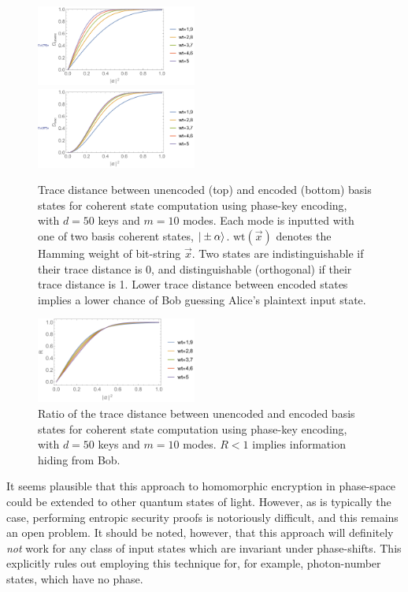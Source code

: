 \begin{figure}[!htb]
\includegraphics[width=0.47\textwidth]{coherent_state_homo_unenc} \\
\includegraphics[width=0.47\textwidth]{coherent_state_homo_enc}
\caption{Trace distance between unencoded (top) and encoded (bottom) basis states for coherent state computation using phase-key encoding, with \mbox{$d=50$} keys and \mbox{$m=10$} modes. Each mode is inputted with one of two basis coherent states, \mbox{$|\pm\alpha\rangle$}. \mbox{$\text{wt}(\vec{x})$} denotes the Hamming weight of bit-string $\vec{x}$. Two states are indistinguishable if their trace distance is 0, and distinguishable (orthogonal) if their trace distance is 1. Lower trace distance between encoded states implies a lower chance of Bob guessing Alice's plaintext input state.} \label{fig:homo_coh_st_tr}
\end{figure}

\begin{figure}[!htb]
\includegraphics[width=0.47\textwidth]{coherent_state_homo_ratio}
\caption{Ratio of the trace distance between unencoded and encoded basis states for coherent state computation using phase-key encoding, with \mbox{$d=50$} keys and \mbox{$m=10$} modes. \mbox{$R<1$} implies information hiding from Bob.} \label{fig:homo_coh_st_ratio}
\end{figure}

It seems plausible that this approach to homomorphic encryption in phase-space could be extended to other quantum states of light. However, as is typically the case, performing entropic security proofs is notoriously difficult, and this remains an open problem. It should be noted, however, that this approach will definitely \textit{not} work for any class of input states which are invariant under phase-shifts. This explicitly rules out employing this technique for, for example, photon-number states, which have no phase.

